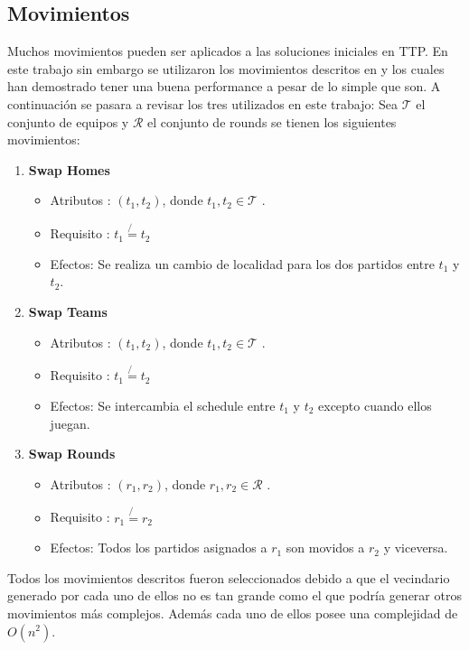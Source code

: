 \documentclass[letter, 10pt]{article}
\begin{document}
\subsection{Movimientos}
    Muchos movimientos pueden ser aplicados a las soluciones iniciales en TTP. En este trabajo sin embargo se utilizaron los movimientos descritos en \cite{simulated} y \cite{Tabu} los cuales han demostrado tener una buena performance a pesar de lo simple que son. A continuación se pasara a revisar los tres utilizados en este trabajo:
    Sea $\mathcal{T}$ el conjunto de equipos y $\mathcal{R}$ el conjunto de rounds se tienen los siguientes movimientos:
\begin{enumerate}
    \item \textbf{Swap Homes}
    \begin{itemize}
        \item Atributos : $(t_1, t_2)$, donde $t_1, t_2 \in \mathcal{T}$ .
        \item Requisito : $t_1 \not{=} t_2$
        \item Efectos: Se realiza un cambio de localidad para los dos partidos entre $t_1$ y $t_2$.
    \end{itemize}
    \item \textbf{Swap Teams}
    \begin{itemize}
        \item Atributos : $(t_1, t_2)$, donde $t_1, t_2 \in \mathcal{T}$ .
        \item Requisito : $t_1 \not{=} t_2$
        \item Efectos: Se intercambia el schedule entre $t_1$ y $t_2$ excepto cuando ellos juegan.
    \end{itemize}
    \item \textbf{Swap Rounds}
    \begin{itemize}
        \item Atributos : $(r_1, r_2)$, donde $r_1, r_2 \in \mathcal{R}$ .
        \item Requisito : $r_1 \not{=} r_2$
        \item Efectos: Todos los partidos asignados a $r_1$ son movidos a $r_2$ y viceversa.
    \end{itemize}
\end{enumerate}
    Todos los movimientos descritos fueron seleccionados debido a que el vecindario generado por cada uno de ellos no es tan grande como el que podría generar otros movimientos más complejos. Además cada uno de ellos posee una complejidad de $O(n^2)$.
\end{document}
